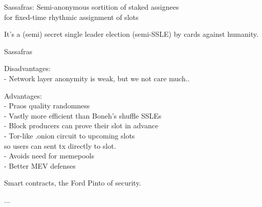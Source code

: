 \documentclass{beamer}
\begin{document}
\begin{frame}

Sassafras: Semi-anonymous sortition of staked assignees \\
\hspace{5pt} for fixed-time rhythmic assignment of slots

\bigskip\bigskip

It's a (semi) secret single leader election (semi-SSLE) by cards against humanity.

\end{frame}



\begin{frame}{Sassafras}

Disadvantages: \\
- Network layer anonymity is weak, but we not care much.. \\

\bigskip\bigskip

Advantages: \\ \smallskip
- Praos quality randomness \\ \smallskip
- Vastly more efficient than Boneh's shuffle SSLEs \\ \smallskip
- Block producers can prove their slot in advance \\ \smallskip
- Tor-like {.onion} circuit to upcoming slots \\
  \hspace{5pt} so users can sent tx directly to slot. \\ \smallskip
- Avoids need for memepools \\ \smallskip
- Better MEV defenses \\ \smallskip

\pause\bigskip\bigskip

\hspace{10pt} Smart contracts, the Ford Pinto of security.

\end{frame}



\begin{frame}
	
...	
	
\end{frame}
\end{document}
